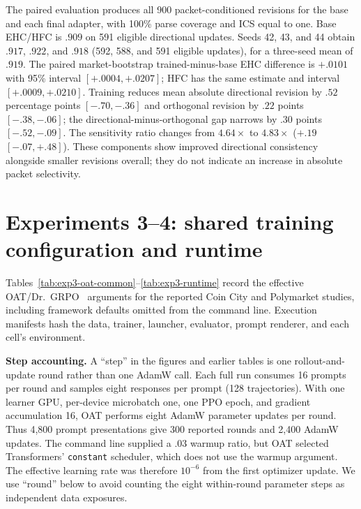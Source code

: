 The paired evaluation produces all 900 packet-conditioned revisions for the base
and each final adapter, with 100\% parse coverage and ICS equal to one. Base
EHC/HFC is $.909$ on 591 eligible directional updates. Seeds 42, 43, and 44 obtain
$.917$, $.922$, and $.918$ (592, 588, and 591 eligible updates), for a
three-seed mean of $.919$. The paired market-bootstrap trained-minus-base EHC
difference is $+.0101$ with 95\% interval $[+.0004,+.0207]$; HFC has the same
estimate and interval $[+.0009,+.0210]$. Training reduces mean absolute
directional revision by $.52$ percentage points $[-.70,-.36]$ and orthogonal
revision by $.22$ points $[-.38,-.06]$; the directional-minus-orthogonal gap
narrows by $.30$ points $[-.52,-.09]$. The sensitivity ratio changes from
$4.64\times$ to $4.83\times$ ($+.19$ $[-.07,+.48]$). These components show
improved directional consistency alongside smaller revisions overall; they do
not indicate an increase in absolute packet selectivity.
\begin{center}
\begin{minipage}{.82\linewidth}
\centering
{}
\label{tab:exp3b-update-seed-results}
\scriptsize
\setlength{\tabcolsep}{4pt}
\resizebox{\linewidth}{!}{%

}
\end{minipage}
\end{center}

\section{Experiments 3--4: shared training configuration and runtime}
\label{app:exp3-complete-training-setup}

Tables~\ref{tab:exp3-oat-common}--\ref{tab:exp3-runtime} record the effective
OAT/Dr.~GRPO~\citep{liu2024oat} arguments for the reported Coin City and Polymarket studies, including framework defaults omitted from the command line.
Execution manifests hash the data, trainer, launcher, evaluator, prompt
renderer, and each cell's environment.

\noindent\textbf{Step accounting.}
A ``step'' in the figures and earlier tables is one rollout-and-update round rather than one
AdamW call.  Each full run consumes 16 prompts per round and samples eight responses
per prompt (128 trajectories).  With one learner GPU, per-device microbatch one, one
PPO epoch, and gradient accumulation 16, OAT performs eight AdamW parameter updates per
round. Thus 4,800 prompt presentations give 300 reported rounds and 2,400 AdamW
updates. The command line supplied a .03 warmup ratio, but OAT selected
Transformers' \texttt{constant} scheduler, which does not use the warmup argument.
The effective learning rate was therefore $10^{-6}$ from the first optimizer
update. We use ``round'' below to avoid counting the eight within-round parameter
steps as independent data exposures.

